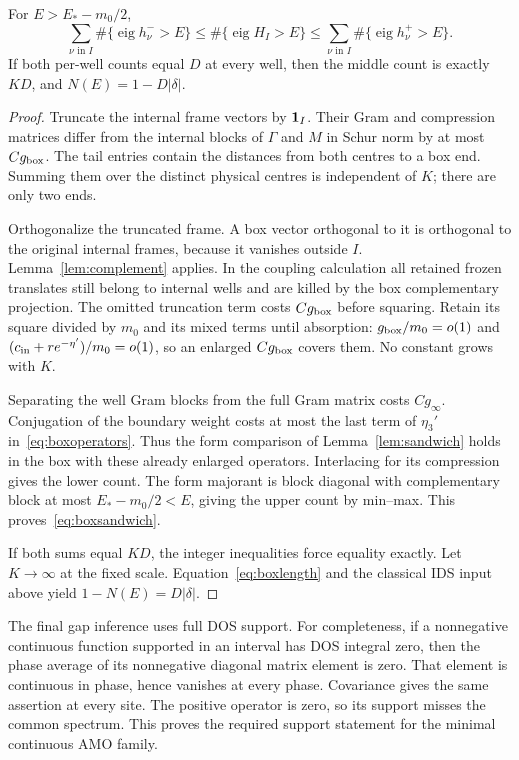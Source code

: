 \begin{proposition}\label{prop:box}
For $E>E_*-m_0/2$,
\begin{equation}\label{eq:boxsandwich}
 \sum_{\nu\text{ in }I}\#\{\operatorname{eig}h_\nu^->E\}
 \le\#\{\operatorname{eig}H_I>E\}
 \le\sum_{\nu\text{ in }I}\#\{\operatorname{eig}h_\nu^+>E\}.
\end{equation}
If both per-well counts equal $D$ at every well, then the middle count is exactly $KD$, and $N(E)=1-D|\delta|$.
\end{proposition}
\begin{proof}
Truncate the internal frame vectors by $\mathbf 1_I$. Their Gram and compression matrices differ from the internal blocks of $\Gamma$ and $M$ in Schur norm by at most $Cg_{\rm box}$. The tail entries contain the distances from both centres to a box end. Summing them over the distinct physical centres is independent of $K$; there are only two ends.

Orthogonalize the truncated frame. A box vector orthogonal to it is orthogonal to the original internal frames, because it vanishes outside $I$. Lemma~\ref{lem:complement} applies. In the coupling calculation all retained frozen translates still belong to internal wells and are killed by the box complementary projection. The omitted truncation term costs $Cg_{\rm box}$ before squaring. Retain its square divided by $m_0$ and its mixed terms until absorption: $g_{\rm box}/m_0=o(1)$ and $(c_{\rm in}+re^{-\eta'})/m_0=o(1)$, so an enlarged $Cg_{\rm box}$ covers them. No constant grows with $K$.

Separating the well Gram blocks from the full Gram matrix costs $Cg_\infty$. Conjugation of the boundary weight costs at most the last term of $\eta_3'$ in~\eqref{eq:boxoperators}. Thus the form comparison of Lemma~\ref{lem:sandwich} holds in the box with these already enlarged operators. Interlacing for its compression gives the lower count. The form majorant is block diagonal with complementary block at most $E_*-m_0/2<E$, giving the upper count by min--max. This proves~\eqref{eq:boxsandwich}.

If both sums equal $KD$, the integer inequalities force equality exactly. Let $K\to\infty$ at the fixed scale. Equation~\eqref{eq:boxlength} and the classical IDS input above yield $1-N(E)=D|\delta|$.
\end{proof}

The final gap inference uses full DOS support. For completeness, if a nonnegative continuous function supported in an interval has DOS integral zero, then the phase average of its nonnegative diagonal matrix element is zero. That element is continuous in phase, hence vanishes at every phase. Covariance gives the same assertion at every site. The positive operator is zero, so its support misses the common spectrum. This proves the required support statement for the minimal continuous AMO family.

\label{end:global}

